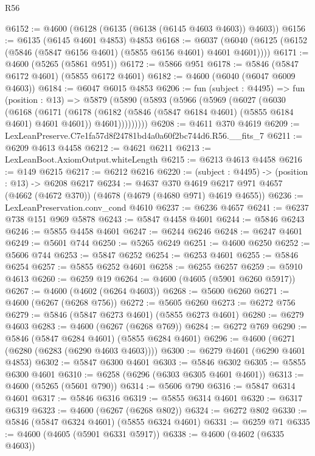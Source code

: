 \begin{lexlean}{R56}
\begin{coremodule}
@6152 := @4600 (@6128 (@6135 (@6138 (@6145 @4603 @4603)) @4603))
@6156 := @6135 (@6145 @4601 @4853) @4853
@6168 := @6037 (@6040 (@6125 (@6152 (@5846 (@5847 @6156 @4601) (@5855 @6156 @4601) @4601 @4601))))
@6171 := @4600 (@5265 (@5861 @951))
@6172 := @5866 @951
@6178 := @5846 (@5847 @6172 @4601) (@5855 @6172 @4601)
@6182 := @4600 (@6040 (@6047 @6009 @4603))
@6184 := @6047 @6015 @4853
@6206 := fun (subject : @4495) =>
  fun (position : @13) =>
  @5879
    (@5890
      (@5893
        (@5966
          (@5969
            (@6027
              (@6030
                (@6168
                  (@6171
                    (@6178
                      (@6182 (@5846 (@5847 @6184 @4601) (@5855 @6184 @4601) @4601 @4601))
                      @4601)))))))))
@6208 := @4611 @370 @4619
@6209 := LexLeanPreserve.C7e1fa57d8f24781bd4a0a60f2bc744d6.R56.__fits_7
@6211 := @6209 @4613 @4458
@6212 := @4621 @6211
@6213 := LexLeanBoot.AxiomOutput.whiteLength
@6215 := @6213 @4613 @4458
@6216 := @149 @6215
@6217 := @6212 @6216
@6220 := (subject : @4495) -> (position : @13) -> @6208 @6217
@6234 := @4637
    @370
    @4619
    @6217
    @971
    @4657
    (@4662 (@4672 @370))
    (@4678 (@4679 (@4680 @971) @4619 @4655))
@6236 := LexLeanPreservation.conv_cond @4610
@6237 := @6236 @4657
@6241 := @6237 @738 @151 @969 @5878
@6243 := @5847 @4458 @4601
@6244 := @5846 @6243
@6246 := @5855 @4458 @4601
@6247 := @6244 @6246
@6248 := @6247 @4601
@6249 := @5601 @744
@6250 := @5265 @6249
@6251 := @4600 @6250
@6252 := @5606 @744
@6253 := @5847 @6252
@6254 := @6253 @4601
@6255 := @5846 @6254
@6257 := @5855 @6252 @4601
@6258 := @6255 @6257
@6259 := @5910 @4613
@6260 := @6259 @19
@6264 := @4600 (@4605 (@5901 @6260 @5917))
@6267 := @4600 (@4602 (@6264 @4603))
@6268 := @5600 @6260
@6271 := @4600 (@6267 (@6268 @756))
@6272 := @5605 @6260
@6273 := @6272 @756
@6279 := @5846 (@5847 @6273 @4601) (@5855 @6273 @4601)
@6280 := @6279 @4603
@6283 := @4600 (@6267 (@6268 @769))
@6284 := @6272 @769
@6290 := @5846 (@5847 @6284 @4601) (@5855 @6284 @4601)
@6296 := @4600 (@6271 (@6280 (@6283 (@6290 @4603 @4603))))
@6300 := @6279 @4601 (@6290 @4601 @4853)
@6302 := @5847 @6300 @4601
@6303 := @5846 @6302
@6305 := @5855 @6300 @4601
@6310 := @6258 (@6296 (@6303 @6305 @4601 @4601))
@6313 := @4600 (@5265 (@5601 @790))
@6314 := @5606 @790
@6316 := @5847 @6314 @4601
@6317 := @5846 @6316
@6319 := @5855 @6314 @4601
@6320 := @6317 @6319
@6323 := @4600 (@6267 (@6268 @802))
@6324 := @6272 @802
@6330 := @5846 (@5847 @6324 @4601) (@5855 @6324 @4601)
@6331 := @6259 @71
@6335 := @4600 (@4605 (@5901 @6331 @5917))
@6338 := @4600 (@4602 (@6335 @4603))

\end{coremodule}
\end{lexlean}
